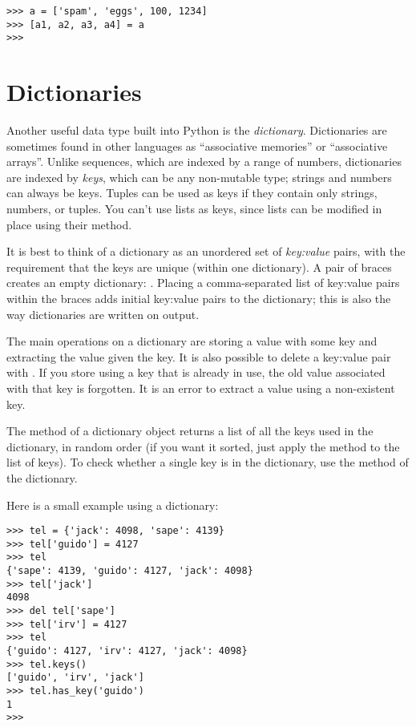 \bcode\begin{verbatim}
>>> a = ['spam', 'eggs', 100, 1234]
>>> [a1, a2, a3, a4] = a
>>>
\end{verbatim}\ecode

\section{Dictionaries}

Another useful data type built into Python is the \emph{dictionary}.
Dictionaries are sometimes found in other languages as ``associative
memories'' or ``associative arrays''.  Unlike sequences, which are
indexed by a range of numbers, dictionaries are indexed by \emph{keys},
which can be any non-mutable type; strings and numbers can always be
keys.  Tuples can be used as keys if they contain only strings,
numbers, or tuples.  You can't use lists as keys, since lists can be
modified in place using their  method.

It is best to think of a dictionary as an unordered set of
\emph{key:value} pairs, with the requirement that the keys are unique
(within one dictionary).
A pair of braces creates an empty dictionary: \code{\{\}}.
Placing a comma-separated list of key:value pairs within the
braces adds initial key:value pairs to the dictionary; this is also the
way dictionaries are written on output.

The main operations on a dictionary are storing a value with some key
and extracting the value given the key.  It is also possible to delete
a key:value pair
with .
If you store using a key that is already in use, the old value
associated with that key is forgotten.  It is an error to extract a
value using a non-existent key.

The  method of a dictionary object returns a list of all the
keys used in the dictionary, in random order (if you want it sorted,
just apply the  method to the list of keys).  To check
whether a single key is in the dictionary, use the 
method of the dictionary.

Here is a small example using a dictionary:

\bcode\begin{verbatim}
>>> tel = {'jack': 4098, 'sape': 4139}
>>> tel['guido'] = 4127
>>> tel
{'sape': 4139, 'guido': 4127, 'jack': 4098}
>>> tel['jack']
4098
>>> del tel['sape']
>>> tel['irv'] = 4127
>>> tel
{'guido': 4127, 'irv': 4127, 'jack': 4098}
>>> tel.keys()
['guido', 'irv', 'jack']
>>> tel.has_key('guido')
1
>>> 
\end{verbatim}\ecode

